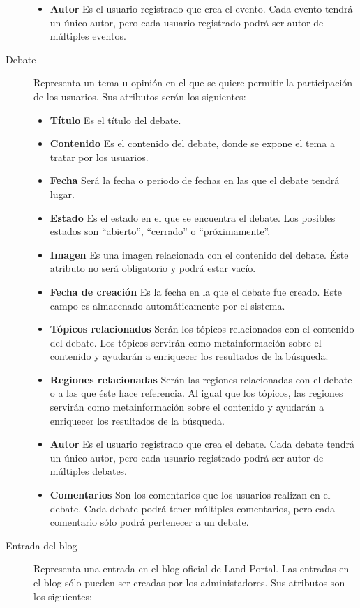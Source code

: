 \begin{description}
\begin{itemize}
							\item \textbf{Autor}  Es el usuario registrado que crea el evento.  Cada evento tendrá un único autor, pero cada usuario registrado podrá ser autor de múltiples eventos.
							\end{itemize}
\item[Debate]  Representa un tema u opinión en el que se quiere permitir la participación de los usuarios.  Sus atributos serán los siguientes:
							\begin{itemize}
							\item \textbf{Título}  Es el título del debate.
							\item \textbf{Contenido}  Es el contenido del debate, donde se expone el tema a tratar por los usuarios.
							\item \textbf{Fecha}  Será la fecha o periodo de fechas en las que el debate tendrá lugar.
							\item \textbf{Estado}  Es el estado en el que se encuentra el debate.  Los posibles estados son ``abierto'', ``cerrado'' o ``próximamente''.
							\item \textbf{Imagen}  Es una imagen relacionada con el contenido del debate.  Éste atributo no será obligatorio y podrá estar vacío.
							\item \textbf{Fecha de creación}  Es la fecha en la que el debate fue creado.  Este campo es almacenado automáticamente por el sistema.
							\item \textbf{Tópicos relacionados}  Serán los tópicos relacionados con el contenido del debate.  Los tópicos servirán como metainformación sobre el contenido y ayudarán a enriquecer los resultados de la búsqueda.
							\item \textbf{Regiones relacionadas}  Serán las regiones relacionadas con el debate o a las que éste hace referencia.  Al igual que los tópicos, las regiones servirán como metainformación sobre el contenido y ayudarán a enriquecer los resultados de la búsqueda.
							\item \textbf{Autor}  Es el usuario registrado que crea el debate.  Cada debate tendrá un único autor, pero cada usuario registrado podrá ser autor de múltiples debates.
							\item \textbf{Comentarios}  Son los comentarios que los usuarios realizan en el debate.  Cada debate podrá tener múltiples comentarios, pero cada comentario sólo podrá pertenecer a un debate.
							\end{itemize}
\item[Entrada del blog]  Representa una entrada en el blog oficial de Land Portal.  Las entradas en el blog sólo pueden ser creadas por los administadores.  Sus atributos son los siguientes:

\end{description}
